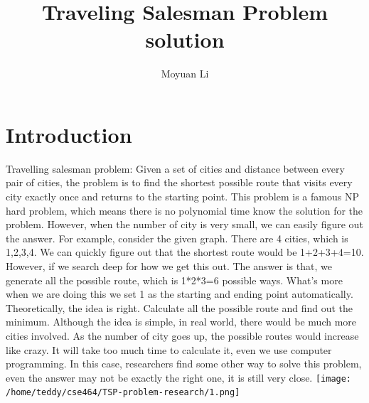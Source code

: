 \documentclass[a4paper,man,natbib]{apa6}
\title{Traveling Salesman Problem solution}
\author{Moyuan Li}
\affiliation{Miami Oxford}
\begin{document}
\maketitle

\section{Introduction}
Travelling salesman problem: Given a set of cities and distance between every pair of cities, the problem is to find the shortest possible route that visits every city exactly once and returns to the starting point. This problem is a famous NP hard problem, which means there is no polynomial time know the solution for the problem. However, when the number of city is very small, we can easily figure out the answer. For example, consider the given graph. There are 4 cities, which is 1,2,3,4. We can quickly figure out that the shortest route would be 1+2+3+4=10. However, if we search deep for how we get this out. The answer is that, we generate all the possible route, which is 1*2*3=6 possible ways. What’s more when we are doing this we set 1 as the starting and ending point automatically. Theoretically, the idea is right. Calculate all the possible route and find out the minimum. Although the idea is simple, in real world, there would be much more cities involved. As the number of city goes up, the possible routes would increase like crazy. It will take too much time to calculate it, even we use computer programming. In this case, researchers find some other way to solve this problem, even the answer may not be exactly the right one, it is still very close. 
\texttt{[image: /home/teddy/cse464/TSP-problem-research/1.png]}
\end{document}
